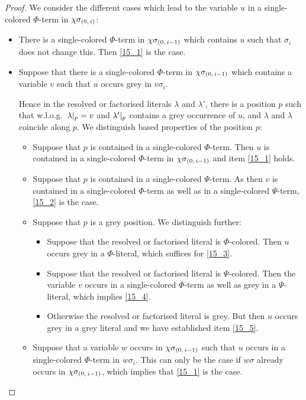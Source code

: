 \documentclass[,%
	draft=false,%
	numbers=noendperiod
	12pt,
	a4paper,
	oneside,%
	openany,
]{memoir}
\begin{document}
\begin{proof}
	We consider the different cases which lead to the variable $u$ in a single-colored $\Phi$-term in $\chi\sigma_{(0,\,i)}$:

	\begin{itemize}
		\item There is a single-colored $\Phi$-term in $\chi\sigma_{(0,\,i-1)}$ which contains $u$ such that $\sigma_i$ does not change this.
			Then \ref{15_1} is the case.

		\item Suppose that there is a single-colored $\Phi$-term in $\chi\sigma_{(0,\,i-1)}$ which contains a variable $v$ such that $u$ occurs grey in $v\sigma_i$.

			Hence in the resolved or factorised literals $\lambda$ and $\lambda'$, there is a position $p$ such that w.l.o.g.\ $\lambda|_{p} = v$ and $\lambda'|_{p}$ contains a grey occurrence of $u$, and $\lambda$ and $\lambda$ coincide along $p$.
			We distinguish based properties of the position $p$:

			\begin{itemize}
				\item Suppose that $p$ is contained in a single-colored $\Phi$-term.
					Then $u$ is contained in a single-colored $\Phi$-term in $\chi\sigma_{(0,\,i-1)}$ and item \ref{15_1} holds.

				\item Suppose that $p$ is contained in a single-colored $\Psi$-term.
					As then $v$ is contained in a single-colored $\Phi$-term as well as in a single-colored $\Psi$-term, \ref{15_2} is the case.

				\item Suppose that $p$ is a grey position.
					We distinguish further:

					\begin{itemize}
						\item Suppose that the resolved or factorised literal is $\Phi$-colored.
							Then $u$ occurs grey in a $\Phi$-literal, which suffices for \ref{15_3}. 

						\item Suppose that the resolved or factorised literal is $\Psi$-colored.
							Then the variable $v$ occurs in a single-colored $\Phi$-term as well as grey in a $\Psi$-literal, which implies \ref{15_4}.

						\item
							Otherwise the resolved or factorised literal is grey. 
							But then $u$ occurs grey in a grey literal and we have established item \ref{15_5}.
					\end{itemize}


				\item Suppose that a variable $w$ occurs in $\chi\sigma_{(0,\,i-1)}$ such that $u$ occurs in a single-colored $\Phi$-term in $w\sigma_i$.
					This can only be the case if $w\sigma$ already occurs in $\chi\sigma_{(0,\,i-1)}$, which implies that \ref{15_1} is the case.
					\qedhere
			\end{itemize}
	\end{itemize}

\end{proof}
\end{document}
